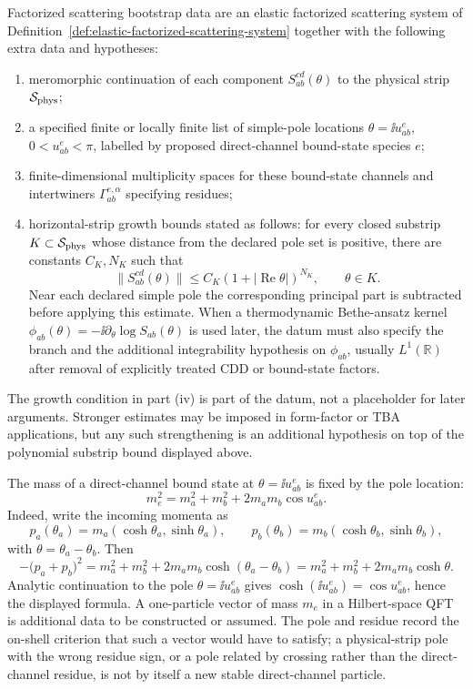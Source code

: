 \begin{definition}
\label{def:factorized-scattering-bootstrap-data}
Factorized scattering bootstrap data are an elastic factorized scattering
system of Definition~\ref{def:elastic-factorized-scattering-system} together
with the following extra data and hypotheses:
\begin{enumerate}[label=(\roman*)]
\item meromorphic continuation of each component
  \(S_{ab}^{cd}(\theta)\) to the physical strip
  \(\mathcal S_{\rm phys}\);
\item a specified finite or locally finite list of simple-pole locations
  \(\theta=\ii u_{ab}^{e}\), \(0<u_{ab}^{e}<\pi\), labelled by proposed
  direct-channel bound-state species \(e\);
\item finite-dimensional multiplicity spaces for these bound-state channels
  and intertwiners \(\Gamma_{ab}^{e,\alpha}\) specifying residues;
\item horizontal-strip growth bounds stated as follows: for every closed
  substrip \(K\subset\mathcal S_{\rm phys}\) whose distance from the declared
  pole set is positive, there are constants \(C_K,N_K\) such that
  \[
    \|S_{ab}^{cd}(\theta)\|
    \le C_K(1+|\operatorname{Re}\theta|)^{N_K},
    \qquad \theta\in K.
  \]
  Near each declared simple pole the corresponding principal part is
  subtracted before applying this estimate.  When a thermodynamic
  Bethe-ansatz kernel
  \(\phi_{ab}(\theta)=-\ii\partial_\theta\log S_{ab}(\theta)\) is used later,
  the datum must also specify the branch and the additional integrability
  hypothesis on \(\phi_{ab}\), usually \(L^1(\mathbb R)\) after removal of
  explicitly treated CDD or bound-state factors.
\end{enumerate}
\end{definition}

The growth condition in part (iv) is part of the datum, not a placeholder for
later arguments.  Stronger estimates may be imposed in form-factor or TBA
applications, but any such strengthening is an additional hypothesis on top
of the polynomial substrip bound displayed above.

The mass of a direct-channel bound state at \(\theta=\ii u_{ab}^{e}\) is
fixed by the pole location:
\[
  m_e^2
  =
  m_a^2+m_b^2+2m_am_b\cos u_{ab}^{e}.
\]
Indeed, write the incoming momenta as
\[
  p_a(\theta_a)=m_a(\cosh\theta_a,\sinh\theta_a),
  \qquad
  p_b(\theta_b)=m_b(\cosh\theta_b,\sinh\theta_b),
\]
with \(\theta=\theta_a-\theta_b\).  Then
\[
  -\bigl(p_a+p_b\bigr)^2
  =
  m_a^2+m_b^2+2m_am_b\cosh(\theta_a-\theta_b)
  =
  m_a^2+m_b^2+2m_am_b\cosh\theta .
\]
Analytic continuation to the pole \(\theta=\ii u_{ab}^{e}\) gives
\(\cosh(\ii u_{ab}^{e})=\cos u_{ab}^{e}\), hence the displayed formula.  A
one-particle vector of mass \(m_e\) in a Hilbert-space QFT is additional data
to be constructed or assumed.  The pole and residue record the on-shell
criterion that such a vector would have to satisfy; a physical-strip pole
with the wrong residue sign, or a pole related by crossing rather than the
direct-channel residue, is not by itself a new stable direct-channel
particle.

